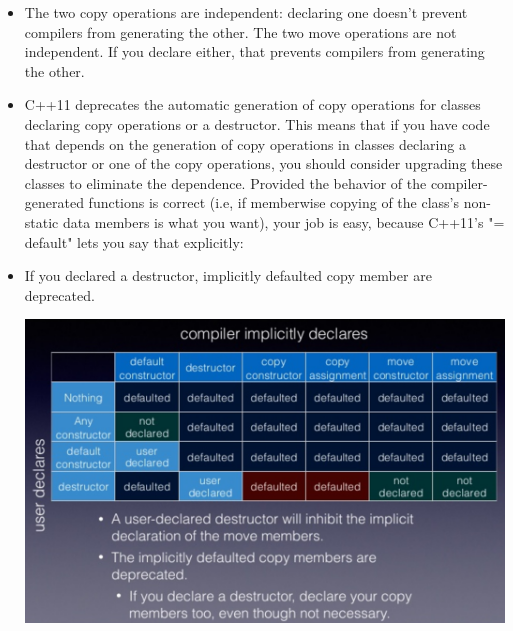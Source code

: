 \documentclass[a4paper,11pt,twoside]{book}
\begin{document}
\begin{itemize}
\item The two copy operations are independent: declaring one doesn't prevent compilers from generating the other. The two move operations are not independent. If you declare either, that prevents compilers from generating the other.

\item C++11 deprecates the automatic generation of copy operations for classes declaring copy operations or a destructor. This means that if you have code that depends on the generation of copy operations in classes declaring a destructor or one of the copy operations, you should consider upgrading these classes to eliminate the dependence. Provided the behavior of the compiler-generated functions is correct (i.e, if memberwise copying of the class's non-static data members is what you want), your job is easy, because C++11's "= default" lets you say that explicitly:

\item If you declared a destructor, implicitly defaulted copy member are deprecated.  \\

\begin{center}
\includegraphics[scale=0.6]{pics/sm4.png} \newline
\end{center}


\end{itemize}
\end{document}
